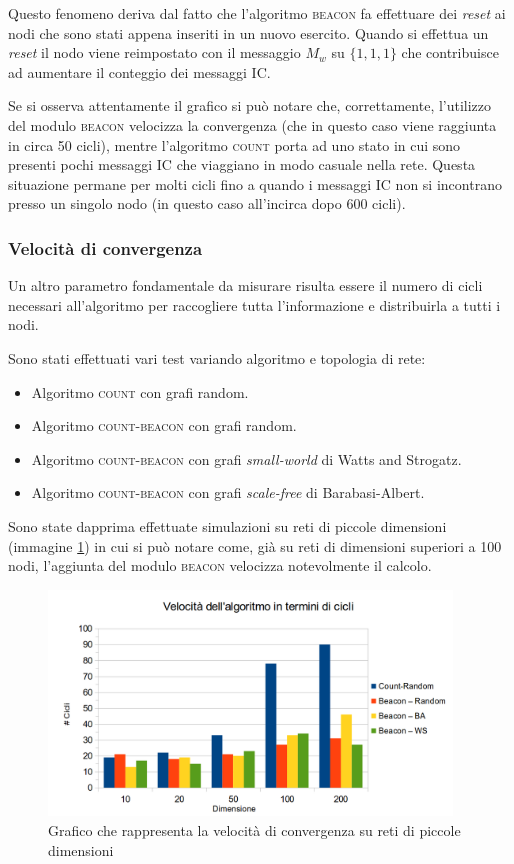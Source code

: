 \documentclass[a4paper,12pt]{article}
\begin{document}
Questo fenomeno deriva dal fatto che l'algoritmo \textsc{beacon} fa effettuare dei \emph{reset} ai nodi che sono stati appena inseriti in un nuovo esercito. Quando si effettua un \emph{reset} il nodo viene reimpostato con il messaggio $M_w$ su $\{1, 1, 1\}$ che contribuisce ad aumentare il conteggio dei messaggi IC.

Se si osserva attentamente il grafico si pu\`o notare che, correttamente, l'utilizzo del modulo \textsc{beacon} velocizza la convergenza (che in questo caso viene raggiunta in circa 50 cicli), mentre l'algoritmo \textsc{count} porta ad uno stato in cui sono presenti pochi messaggi IC che viaggiano in modo casuale nella rete. Questa situazione permane per molti cicli fino a quando i messaggi IC non si incontrano presso un singolo nodo (in questo caso all'incirca dopo 600 cicli).

\subsubsection{Velocit\`a di convergenza}

Un altro parametro fondamentale da misurare risulta essere il numero di cicli necessari all'algoritmo per raccogliere tutta l'informazione e distribuirla a tutti i nodi.

Sono stati effettuati vari test variando algoritmo e topologia di rete:
\begin{itemize}
\item Algoritmo \textsc{count} con grafi random.
\item Algoritmo \textsc{count-beacon} con grafi random.
\item Algoritmo \textsc{count-beacon} con grafi \emph{small-world} di Watts and Strogatz.
\item Algoritmo \textsc{count-beacon} con grafi \emph{scale-free} di Barabasi-Albert.
\end{itemize}

Sono state dapprima effettuate simulazioni su reti di piccole dimensioni (immagine \ref{img:speed_low}) in cui si pu\`o notare come, gi\`a su reti di dimensioni superiori a 100 nodi, l'aggiunta del modulo \textsc{beacon} velocizza notevolmente il calcolo.

\begin{figure}[ht]
\centering
\includegraphics[height=6cm]{speed_low.png}
\caption{Grafico che rappresenta la velocit\`a di convergenza su reti di piccole dimensioni}
\label{img:speed_low}
\end{figure}
\end{document}
